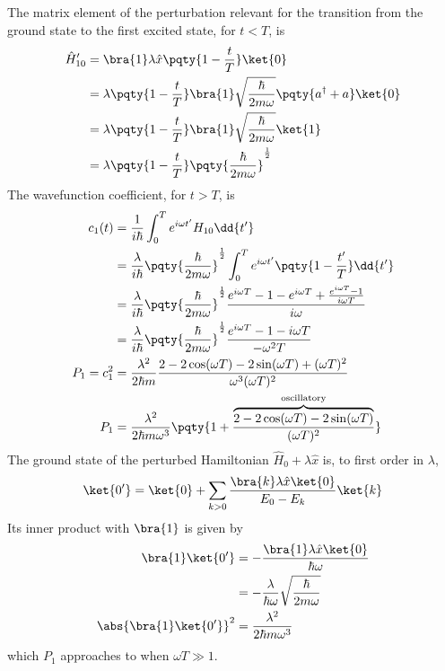 \documentclass[12pt]{article}
\begin{document}
        \subsection{} The matrix element of the perturbation relevant for the transition from the ground state to the first excited state, for \(t < T\), is \begin{align*}
            \hat{H}'_{10} &= \bra{1} \lambda \hat{x} \pqty{1 - \frac{t}{T}} \ket{0} \\
            &= \lambda\pqty{1 - \frac{t}{T}}\bra{1} \sqrt{\frac{\hbar}{2m\omega}}\pqty{a^\dagger + a} \ket{0} \\
            &= \lambda\pqty{1 - \frac{t}{T}}\bra{1} \sqrt{\frac{\hbar}{2m\omega}} \ket{1}  \\
            &= \lambda \pqty{1 - \frac{t}{T}} \pqty{\frac{\hbar}{2m\omega }}^\frac{1}{2}
        \end{align*}
        The wavefunction coefficient, for \(t > T\), is \begin{align*}
            c_1(t) &= \frac{1}{i\hbar} \int_0^T e^{i\omega t'} H_{10} \dd{t'}\\
            &= \frac{\lambda}{i\hbar} \pqty{\frac{\hbar}{2m\omega }}^\frac{1}{2} \int_0^T e^{i\omega t'} \pqty{1 - \frac{t'}{T}}  \dd{t'}\\
            &= \frac{\lambda}{i\hbar} \pqty{\frac{\hbar}{2m\omega }}^\frac{1}{2}\frac{e^{i\omega T } - 1 - e^{i\omega T} + \frac{e^{i\omega T} - 1}{i\omega T}}{i\omega} \\
            &= \frac{\lambda}{i\hbar} \pqty{\frac{\hbar}{2m\omega }}^\frac{1}{2}\frac{e^{i\omega T} - 1 - i\omega T}{ - \omega^2T} \\
            P_1 =c_1^2&= \frac{\lambda^2}{2\hbar m} \frac{2 - 2\cos(\omega T) - 2\sin(\omega T) + (\omega T)^2}{ \omega^3 (\omega T)^2} \\
            P_1&= \frac{\lambda^2}{2\hbar m\omega^3}\pqty{1 +\frac{\overbrace{2 - 2\cos(\omega T) - 2\sin(\omega T)}^\text{oscillatory}}{ (\omega T)^2}}
        \end{align*}
        The ground state of the perturbed Hamiltonian \(\hat{H}_0 + \lambda \hat{x}\) is, to first order in \(\lambda\), \[
            \ket{0'} = \ket{0} + \sum_{k > 0} \frac{\bra{k} \lambda \hat{x} \ket{0} }{E_0 - E_k} \ket{k} 
        \]
        Its inner product with \(\bra{1} \) is given by \begin{align*}
            \bra{1} \ket{0'} &= -\frac{\bra{1} \lambda \hat{x} \ket{0}}{\hbar \omega} \\
            &= -\frac{\lambda}{\hbar \omega} \sqrt{\frac{\hbar}{2m\omega}}\\
            \abs{\bra{1} \ket{0'}}^2 &= \frac{\lambda^2}{2\hbar m\omega^3}
        \end{align*}
        which \(P_1\) approaches to when \(\omega T \gg 1\).
        \newpage
\end{document}
